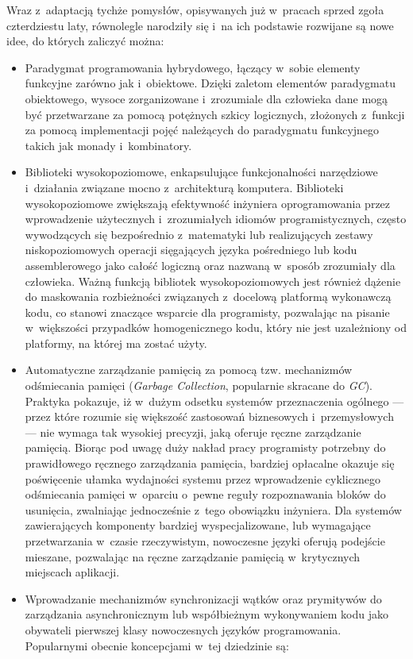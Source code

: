\par{
Wraz z~adaptacją tychże pomysłów, opisywanych już w~pracach sprzed zgoła czterdziestu laty, równolegle narodziły się i~na ich podstawie rozwijane są nowe idee, do których zaliczyć można:
\begin{itemize}
  \item Paradygmat programowania hybrydowego, łączący w~sobie elementy funkcyjne zarówno jak i~obiektowe. Dzięki zaletom elementów paradygmatu obiektowego, wysoce zorganizowane i~zrozumiale dla człowieka dane mogą być przetwarzane za pomocą potężnych szkicy logicznych, złożonych z~funkcji za pomocą implementacji pojęć należących do paradygmatu funkcyjnego takich jak monady i~kombinatory.
  \item Biblioteki wysokopoziomowe, enkapsulujące funkcjonalności narzędziowe i~działania związane mocno z~architekturą komputera. Biblioteki wysokopoziomowe zwiększają efektywność inżyniera oprogramowania przez wprowadzenie użytecznych i~zrozumiałych idiomów programistycznych, często wywodzących się bezpośrednio z~matematyki lub realizujących zestawy niskopoziomowych operacji sięgających języka pośredniego lub kodu assemblerowego jako całość logiczną oraz nazwaną w~sposób zrozumiały dla człowieka. Ważną funkcją bibliotek wysokopoziomowych jest również dążenie do maskowania rozbieżności związanych z~docelową platformą wykonawczą kodu, co stanowi znaczące wsparcie dla programisty, pozwalając na pisanie w~większości przypadków homogenicznego kodu, który nie jest uzależniony od platformy, na której ma zostać użyty.
  \item Automatyczne zarządzanie pamięcią za pomocą tzw. mechanizmów odśmiecania pamięci (\emph{Garbage Collection}, popularnie skracane do \emph{GC}). Praktyka pokazuje, iż w~dużym odsetku systemów przeznaczenia ogólnego --- przez które rozumie się większość zastosowań biznesowych i~przemysłowych --- nie wymaga tak wysokiej precyzji, jaką oferuje ręczne zarządzanie pamięcią. Biorąc pod uwagę duży nakład pracy programisty potrzebny do prawidłowego ręcznego zarządzania pamięcia, bardziej opłacalne okazuje się poświęcenie ułamka wydajności systemu przez wprowadzenie cyklicznego odśmiecania pamięci w~oparciu o~pewne reguły rozpoznawania bloków do usunięcia, zwalniając jednocześnie z~tego obowiązku inżyniera. Dla systemów zawierających komponenty bardziej wyspecjalizowane, lub wymagające przetwarzania w~czasie rzeczywistym, nowoczesne języki oferują podejście mieszane, pozwalając na ręczne zarządzanie pamięcią w~krytycznych miejscach aplikacji.
  \item Wprowadzanie mechanizmów synchronizacji wątków oraz prymitywów do zarządzania asynchronicznym lub współbieżnym wykonywaniem kodu jako obywateli pierwszej klasy nowoczesnych języków programowania. Popularnymi obecnie koncepcjami w~tej dziedzinie są:

\end{itemize}}
